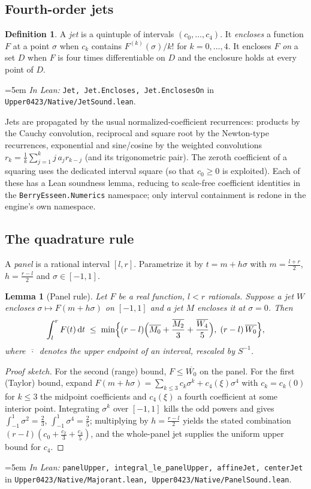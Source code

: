\documentclass[11pt,a4paper]{article}
\newtheorem{lemma}[theorem]{Lemma}
\theoremstyle{definition}
\newtheorem{definition}[theorem]{Definition}
\newcommand{\dd}{\,\mathrm{d}}
\newcommand{\Lean}[1]{\texttt{#1}}
\newcommand{\file}[1]{\texttt{#1}}
\newcommand{\formal}[2]{%
  \par\smallskip
  \begingroup\small\raggedright\emergencystretch=5em
  \noindent\textit{In Lean:} \Lean{#1} in \file{#2}.\par
  \endgroup\smallskip}
\begin{document}
\subsection{Fourth-order jets}

\begin{definition}
  \label{def:jet}
  A \emph{jet} is a quintuple of intervals $(c_0,\dots,c_4)$. It
  \emph{encloses} a function $F$ at a point $\sigma$ when $c_k$ contains
  $F^{(k)}(\sigma)/k!$ for $k=0,\dots,4$. It encloses $F$ \emph{on} a set $D$
  when $F$ is four times differentiable on $D$ and the enclosure holds at every
  point of $D$.
\end{definition}
\formal{Jet, Jet.Encloses, Jet.EnclosesOn}{Upper0423/Native/JetSound.lean}

Jets are propagated by the usual normalized-coefficient recurrences: products by
the Cauchy convolution, reciprocal and square root by the Newton-type
recurrences, exponential and sine/cosine by the weighted convolutions
$r_k=\tfrac1k\sum_{j=1}^{k}j\,a_j r_{k-j}$ (and its trigonometric pair). The
zeroth coefficient of a squaring uses the dedicated interval square (so that
$c_0\ge0$ is exploited). Each of these has a Lean soundness lemma, reducing to
scale-free coefficient identities in the \Lean{BerryEsseen.Numerics} namespace;
only interval containment is redone in the engine's own namespace.

\subsection{The quadrature rule}
\label{sec:panel}

A \emph{panel} is a rational interval $[l,r]$. Parametrize it by
$t=m+h\sigma$ with $m=\tfrac{l+r}2$, $h=\tfrac{r-l}2$ and $\sigma\in[-1,1]$.

\begin{lemma}[Panel rule]
  \label{lem:panel}
  Let $F$ be a real function, $l<r$ rationals. Suppose a jet $W$ encloses
  $\sigma\mapsto F(m+h\sigma)$ on $[-1,1]$ and a jet $M$ encloses it at
  $\sigma=0$. Then
  \[
    \int_l^r F(t)\dd t\;\le\;
    \min\Bigl\{
      (r-l)\Bigl(\overline{M_0}+\frac{\overline{M_2}}{3}+\frac{\overline{W_4}}{5}\Bigr),\;
      (r-l)\,\overline{W_0}
    \Bigr\},
  \]
  where $\overline{\,\cdot\,}$ denotes the upper endpoint of an interval,
  rescaled by $S^{-1}$.
\end{lemma}
\begin{proof}[Proof sketch]
  For the second (range) bound, $F\le \overline{W_0}$ on the panel. For the first
  (Taylor) bound, expand
  $F(m+h\sigma)=\sum_{k\le3}c_k\sigma^k+c_4(\xi)\sigma^4$ with
  $c_k=c_k(0)$ for $k\le3$ the midpoint coefficients and $c_4(\xi)$ a fourth
  coefficient at some interior point. Integrating $\sigma^k$ over $[-1,1]$ kills
  the odd powers and gives $\int_{-1}^1\sigma^2=\tfrac23$,
  $\int_{-1}^1\sigma^4=\tfrac25$; multiplying by $h=\tfrac{r-l}2$ yields the
  stated combination $(r-l)(c_0+\tfrac{c_2}3+\tfrac{c_4}5)$, and the whole-panel
  jet supplies the uniform upper bound for $c_4$.
\end{proof}
\formal{panelUpper, integral\_le\_panelUpper, affineJet, centerJet}{Upper0423/Native/Majorant.lean, Upper0423/Native/PanelSound.lean}
\end{document}
